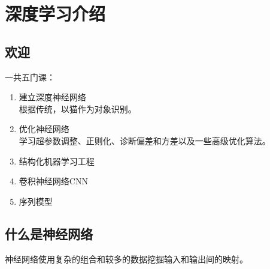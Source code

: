 \documentclass[../../main.tex]{subfiles}
\begin{document}
\chapter{深度学习介绍}

\section{欢迎}
一共五门课：
\begin{enumerate}
    \item 建立深度神经网络\\根据传统，以猫作为对象识别。
    \item 优化神经网络\\学习超参数调整、正则化、诊断偏差和方差以及一些高级优化算法。
    \item 结构化机器学习工程
    \item 卷积神经网络CNN
    \item 序列模型
\end{enumerate}

\section{什么是神经网络}
神经网络使用复杂的组合和较多的数据挖掘输入和输出间的映射。
\end{document}
